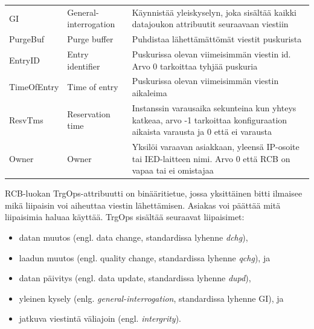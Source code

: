 \begin{table}[ht!]
\begin{tabular}{l | l | l}
		GI & General-interrogation & \parbox[t]{7.5cm}{Käynnistää yleiskyselyn, joka sisältää kaikki datajoukon attribuutit seuraavaan viestiin} \\
		PurgeBuf & Purge buffer & Puhdistaa lähettämättömät viestit puskurista \\
		EntryID & Entry identifier & \parbox[t]{7.5cm}{Puskurissa olevan viimeisimmän viestin id. Arvo 0 tarkoittaa tyhjää puskuria} \\
		TimeOfEntry & Time of entry & \parbox[t]{7.5cm}{Puskurissa olevan viimeisimmän viestin aikaleima} \\
		ResvTms & Reservation time & \parbox[t]{7.5cm}{Instanssin varausaika sekunteina kun yhteys katkeaa, arvo -1 tarkoittaa konfiguraation aikaista varausta ja 0 että ei varausta} \\
		Owner & Owner & \parbox[t]{7.5cm}{Yksilöi varaavan asiakkaan, yleensä IP-osoite tai IED-laitteen nimi. Arvo 0 että RCB on vapaa tai ei omistajaa} \\
		\hline
	\end{tabular}
\end{table}

RCB-luokan TrgOps-attribuutti on binääritietue, jossa yksittäinen bitti ilmaisee mikä liipaisin voi aiheuttaa viestin lähettämisen. Asiakas voi päättää mitä liipaisimia haluaa käyttää. TrgOps sisältää seuraavat liipaisimet:
\begin{itemize}
	\item datan muutos (engl. data change, standardissa lyhenne \emph{dchg}),
	\item laadun muutos (engl. quality change, standardissa lyhenne \emph{qchg}), ja
	\item datan päivitys (engl. data update, standardissa lyhenne \emph{dupd}),
	\item yleinen kysely (enlg. \emph{general-interrogation}, standardissa lyhenne GI), ja 
	\item jatkuva viestintä väliajoin (engl. \emph{intergrity}).
\end{itemize}

